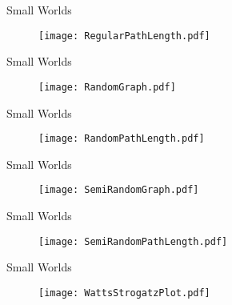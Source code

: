 \documentclass[10pt]{beamer}
\begin{document}
\begin{frame}[fragile]{Small Worlds}

	\begin{figure}[h]
    \centering
  \texttt{[image: RegularPathLength.pdf]}
  	\end{figure}

\end{frame}

\begin{frame}[fragile]{Small Worlds}

	\begin{figure}[h]
    \centering
  \texttt{[image: RandomGraph.pdf]}
  	\end{figure}

\end{frame}

\begin{frame}[fragile]{Small Worlds}

	\begin{figure}[h]
    \centering
  \texttt{[image: RandomPathLength.pdf]}
  	\end{figure}

\end{frame}

\begin{frame}[fragile]{Small Worlds}

	\begin{figure}[h]
    \centering
  \texttt{[image: SemiRandomGraph.pdf]}
  	\end{figure}

\end{frame}

\begin{frame}[fragile]{Small Worlds}

	\begin{figure}[h]
    \centering
  \texttt{[image: SemiRandomPathLength.pdf]}
  	\end{figure}

\end{frame}

\begin{frame}[fragile]{Small Worlds}

	\begin{figure}[h]
    \centering
  \texttt{[image: WattsStrogatzPlot.pdf]}
  	\end{figure}

\end{frame}
\end{document}
